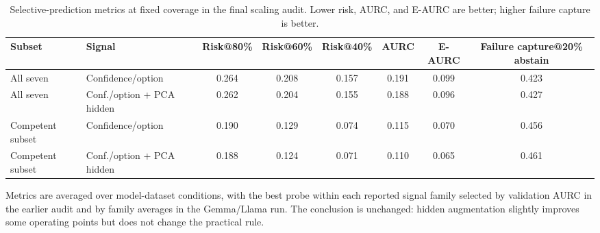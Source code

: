 \begin{table}[t]
\centering
\small
\caption{Selective-prediction metrics at fixed coverage in the final scaling audit. Lower risk, AURC, and E-AURC are better; higher failure capture is better.}
\label{tab:selective-fixed}
\begin{threeparttable}
\begin{adjustbox}{width=\textwidth}
\begin{tabular}{llcccccc}
\toprule
Subset & Signal & Risk@80\% & Risk@60\% & Risk@40\% & AURC & E-AURC & Failure capture@20\% abstain \\
\midrule
All seven & Confidence/option & 0.264 & 0.208 & 0.157 & 0.191 & 0.099 & 0.423 \\
All seven & Conf./option + PCA hidden & 0.262 & 0.204 & 0.155 & 0.188 & 0.096 & 0.427 \\
Competent subset & Confidence/option & 0.190 & 0.129 & 0.074 & 0.115 & 0.070 & 0.456 \\
Competent subset & Conf./option + PCA hidden & 0.188 & 0.124 & 0.071 & 0.110 & 0.065 & 0.461 \\
\bottomrule
\end{tabular}
\end{adjustbox}

\begin{tablenotes}[flushleft]\footnotesize\item \parbox{0.95\textwidth}{Metrics are averaged over model-dataset conditions, with the best probe within each reported signal family selected by validation AURC in the earlier audit and by family averages in the Gemma/Llama run. The conclusion is unchanged: hidden augmentation slightly improves some operating points but does not change the practical rule.}\end{tablenotes}
\end{threeparttable}
\end{table}

